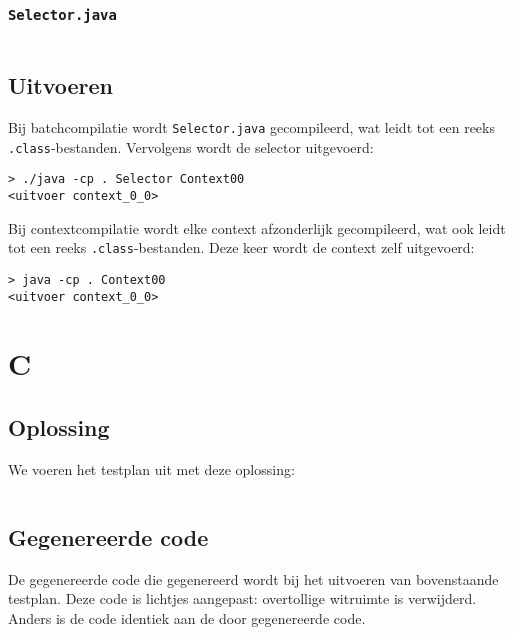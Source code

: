 \subsubsection{\texttt{Selector.java}}

\inputminted{java}{sources/echo-function/Selector.java}

\subsection{Uitvoeren}\label{subsec:echo-function-java-uitvoeren}

Bij batchcompilatie wordt \texttt{Selector.java} gecompileerd, wat leidt tot een reeks \texttt{.class}-bestanden.
Vervolgens wordt de selector uitgevoerd:

\begin{verbatim}
> ./java -cp . Selector Context00
<uitvoer context_0_0>
\end{verbatim}

Bij contextcompilatie wordt elke context afzonderlijk gecompileerd, wat ook leidt tot een reeks \texttt{.class}-bestanden.
Deze keer wordt de context zelf uitgevoerd:

\begin{verbatim}
> java -cp . Context00
<uitvoer context_0_0>
\end{verbatim}

\section{C}\label{sec:echo-function-c}

\subsection{Oplossing}\label{subsec:echo-function-oplossing}

We voeren het testplan uit met deze oplossing:

\inputminted{c}{sources/echo-function/correct.c}

\subsection{Gegenereerde code}\label{subsec:echo-function-c-gegenereerde-code}

De gegenereerde code die gegenereerd wordt bij het uitvoeren van bovenstaande testplan.
Deze code is lichtjes aangepast: overtollige witruimte is verwijderd.
Anders is de code identiek aan de door \tested{} gegenereerde code.

